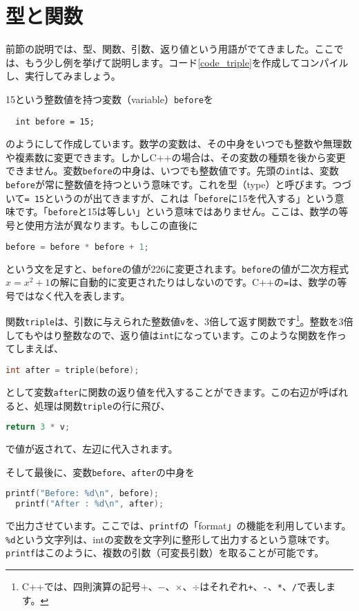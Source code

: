 \section{型と関数}
\label{sec:型と関数}
前節の説明では、型、関数、引数、返り値という用語がでてきました。ここでは、もう少し例を挙げて説明します。コード\ref{code_triple}を作成してコンパイルし、実行してみましょう。

15という整数値を持つ変数（variable）\texttt{before}を
\begin{lstlisting}
  int before = 15; 
\end{lstlisting}
のようにして作成しています。数学の変数は、その中身をいつでも整数や無理数や複素数に変更できます。しかしC++の場合は、その変数の種類を後から変更できません。変数\texttt{before}の中身は、いつでも整数値です。先頭の\texttt{int}は、変数\texttt{before}が常に整数値を持つという意味です。これを型（type）と呼びます。つづいて\texttt{= 15}というのが出てきますが、これは「\texttt{before}に15を代入する」という意味です。「\texttt{before}と15は等しい」という意味ではありません。ここは、数学の等号と使用方法が異なります。もしこの直後に
\begin{lstlisting}[language=c++]
before = before * before + 1;
\end{lstlisting}
という文を足すと、\texttt{before}の値が226に変更されます。\texttt{before}の値が二次方程式$x=x^2+1$の解に自動的に変更されたりはしないのです。C++の\texttt{=}は、数学の等号ではなく代入を表します。

関数\texttt{triple}は、引数に与えられた整数値\texttt{v}を、3倍して返す関数です\footnote{C++では、四則演算の記号$+$、$-$、$\times$、$\div$はそれぞれ\texttt{+}、\texttt{-}、\texttt{*}、\texttt{/}で表します。}。整数を3倍してもやはり整数なので、返り値は\texttt{int}になっています。このような関数を作ってしまえば、
\begin{lstlisting}[language=c++]
  int after = triple(before);
\end{lstlisting}
として変数\texttt{after}に関数の返り値を代入することができます。この右辺が呼ばれると、処理は関数\texttt{triple}の行に飛び、
\begin{lstlisting}[language=c++]
  return 3 * v;
\end{lstlisting}
で値が返されて、左辺に代入されます。

そして最後に、変数\texttt{before}、\texttt{after}の中身を
\begin{lstlisting}[language=c++]
  printf("Before: %d\n", before); 
  printf("After : %d\n", after);
\end{lstlisting} 
で出力させています。ここでは、\texttt{printf}の「format」の機能を利用しています。\texttt{\%d}という文字列は、intの変数を文字列に整形して出力するという意味です。\texttt{printf}はこのように、複数の引数（可変長引数）を取ることが可能です。

